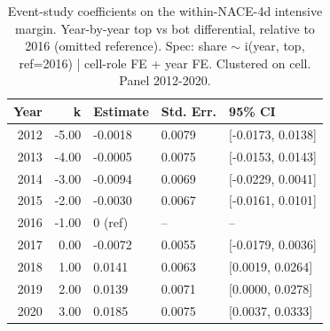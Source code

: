 \begin{table}[ht]
\centering
\caption{Event-study coefficients on the within-NACE-4d intensive margin. Year-by-year top vs bot differential, relative to 2016 (omitted reference). Spec: share $\sim$ i(year, top, ref=2016) | cell-role FE + year FE. Clustered on cell. Panel 2012-2020.} 
\label{tab:phase4_within_intensive_did_eventstudy}
\begin{tabular}{rrlll}
  \toprule
Year & k & Estimate & Std. Err. & 95\% CI \\ 
  \midrule
2012 & -5.00 & -0.0018 & 0.0079 & [-0.0173, 0.0138] \\ 
  2013 & -4.00 & -0.0005 & 0.0075 & [-0.0153, 0.0143] \\ 
  2014 & -3.00 & -0.0094 & 0.0069 & [-0.0229, 0.0041] \\ 
  2015 & -2.00 & -0.0030 & 0.0067 & [-0.0161, 0.0101] \\ 
  2016 & -1.00 & 0 (ref) & -- & -- \\ 
  2017 & 0.00 & -0.0072 & 0.0055 & [-0.0179, 0.0036] \\ 
  2018 & 1.00 & 0.0141 & 0.0063 & [0.0019, 0.0264] \\ 
  2019 & 2.00 & 0.0139 & 0.0071 & [0.0000, 0.0278] \\ 
  2020 & 3.00 & 0.0185 & 0.0075 & [0.0037, 0.0333] \\ 
   \bottomrule
\end{tabular}
\end{table}
